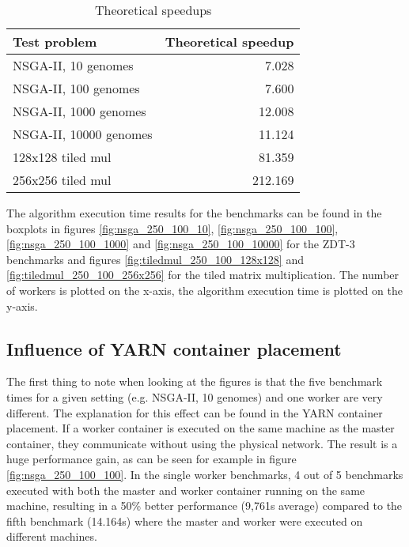 \begin{table}[ht!]
  \centering
  \begin{tabular}{l|r}
    Test problem & Theoretical speedup \\ \hline
    NSGA-II, 10 genomes & 7.028 \\
    NSGA-II, 100 genomes & 7.600 \\
    NSGA-II, 1000 genomes & 12.008 \\
    NSGA-II, 10000 genomes & 11.124 \\
    128x128 tiled mul & 81.359 \\
    256x256 tiled mul & 212.169 \\
  \end{tabular}
  \caption{Theoretical speedups}
  \label{table:theoretical_speedup}
\end{table}


The algorithm execution time results for the benchmarks can be found in the boxplots in figures \ref{fig:nsga_250_100_10}, \ref{fig:nsga_250_100_100}, \ref{fig:nsga_250_100_1000} and \ref{fig:nsga_250_100_10000} for the ZDT-3 benchmarks and figures \ref{fig:tiledmul_250_100_128x128} and \ref{fig:tiledmul_250_100_256x256} for the tiled matrix multiplication. The number of workers is plotted on the x-axis, the algorithm execution time is plotted on the y-axis.

\subsection{Influence of YARN container placement}
The first thing to note when looking at the figures is that the five benchmark times for a given setting (e.g. NSGA-II, 10 genomes) and one worker are very different. The explanation for this effect can be found in the YARN container placement. If a worker container is executed on the same machine as the master container, they communicate without using the physical network. The result is a huge performance gain, as can be seen for example in figure \ref{fig:nsga_250_100_100}. In the single worker benchmarks, 4 out of 5 benchmarks executed with both the master and worker container running on the same machine, resulting in a 50\% better performance (9,761s average) compared to the fifth benchmark (14.164s) where the master and worker were executed on different machines.

